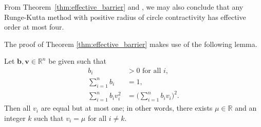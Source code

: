 \begin{remark}
	From Theorem~\ref{thm:effective_barrier} and \cite[Theorem~4.1]{dahlquist2006}, 
  	we may also conclude that any Runge-Kutta method with positive radius of 
  	circle contractivity has effective order at most four.
\end{remark}

The proof of Theorem \ref{thm:effective_barrier} makes use of the following 
lemma.
\begin{lemma}\label{Davids_lemma}
	Let $\bm{b},\bm{v} \in \mathbb{R}^{n}$ be given such that
    \begin{subequations}\label{eq:DavidsLemma}
    		\begin{align}
    			b_i & > 0 \mbox{ for all } i, \label{eq:DavidsLemma_a} \\
    			\sum_{i=1}^n b_i & = 1, \label{eq:DavidsLemma_b} \\
    			\sum_{i=1}^n b_i v_i^2 & = \biggl(\sum_{i=1}^n b_i v_i\biggr)^{\!\! 2}. \label{eq:DavidsLemma_c}
    		\end{align}
    	\end{subequations}
    	Then all $v_i$ are equal but at most one; in other words, there exists 
    	$\mu \in \mathbb{R}$ and an integer $k$ such that $v_i = \mu$ for 
    	all $i \ne k$.
\end{lemma}

